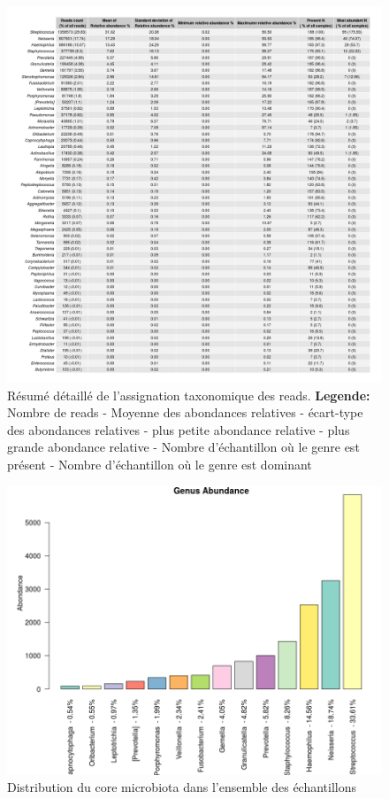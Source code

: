 \documentclass[12pt,a4paper]{article}
\begin{document}
\begin{figure}
\begin{center}
\includegraphics[scale=0.4]{img/alld.png}\hfill
\end{center}
\caption{Résumé détaillé de l'assignation taxonomique des reads. \textbf{Legende:} Nombre de reads - Moyenne des abondances relatives - écart-type des abondances relatives - plus petite abondance relative - plus grande abondance relative - Nombre d'échantillon où le genre est présent - Nombre d'échantillon où le genre est dominant}
\label{alltable}
\end{figure}


\begin{figure}[t]
\begin{center}
\includegraphics[scale=0.5]{img/core.png}\hfill
\end{center}
\caption{Distribution du core microbiota dans l'ensemble des échantillons}
\label{core}
\end{figure}
\end{document}
